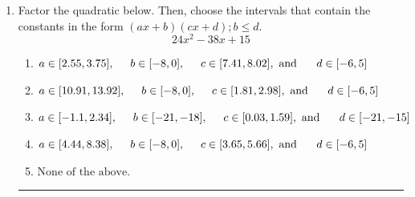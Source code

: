 \documentclass[14pt]{extbook}
\newcommand{\litem}[1]{\item#1\hspace*{-1cm}\rule{\textwidth}{0.4pt}}
\begin{document}
\begin{enumerate}
{\begin{enumerate}[label=\Alph*.]
\end{enumerate} }
\litem{
Factor the quadratic below. Then, choose the intervals that contain the constants in the form $(ax+b)(cx+d); b \leq d.$\[ 24x^{2} -38 x + 15 \]\begin{enumerate}[label=\Alph*.]
\item \( a \in [2.55, 3.75], \hspace*{5mm} b \in [-8, 0], \hspace*{5mm} c \in [7.41, 8.02], \text{ and } \hspace*{5mm} d \in [-6, 5] \)
\item \( a \in [10.91, 13.92], \hspace*{5mm} b \in [-8, 0], \hspace*{5mm} c \in [1.81, 2.98], \text{ and } \hspace*{5mm} d \in [-6, 5] \)
\item \( a \in [-1.1, 2.34], \hspace*{5mm} b \in [-21, -18], \hspace*{5mm} c \in [0.03, 1.59], \text{ and } \hspace*{5mm} d \in [-21, -15] \)
\item \( a \in [4.44, 8.38], \hspace*{5mm} b \in [-8, 0], \hspace*{5mm} c \in [3.65, 5.66], \text{ and } \hspace*{5mm} d \in [-6, 5] \)
\item \( \text{None of the above.} \)

\end{enumerate} }
\end{enumerate}
\end{document}
